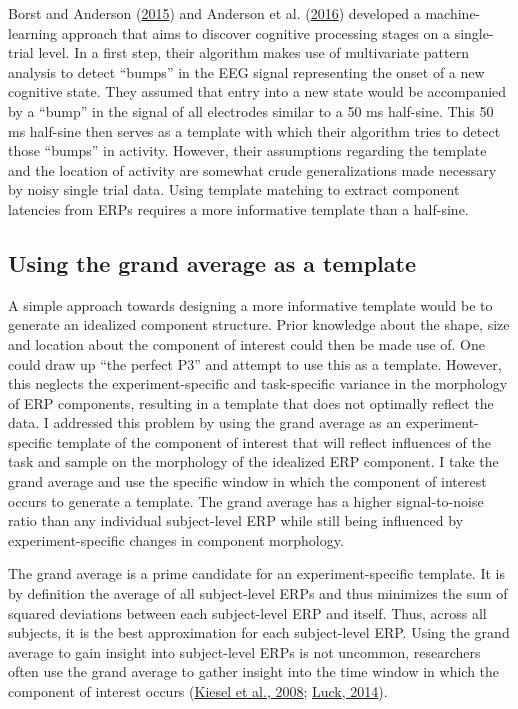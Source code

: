 \documentclass[
  man]{apa7}
\begin{document}
Borst and Anderson (\protect\hyperlink{ref-borst2015discovery}{2015}) and Anderson et al. (\protect\hyperlink{ref-anderson2016discovery}{2016}) developed a machine-learning approach that aims to discover cognitive processing stages on a single-trial level. In a first step, their algorithm makes use of multivariate pattern analysis to detect ``bumps'' in the EEG signal representing the onset of a new cognitive state. They assumed that entry into a new state would be accompanied by a ``bump'' in the signal of all electrodes similar to a 50 ms half-sine. This 50 ms half-sine then serves as a template with which their algorithm tries to detect those ``bumps'' in activity. However, their assumptions regarding the template and the location of activity are somewhat crude generalizations made necessary by noisy single trial data. Using template matching to extract component latencies from ERPs requires a more informative template than a half-sine.

\hypertarget{using-the-grand-average-as-a-template}{%
\subsection{Using the grand average as a template}\label{using-the-grand-average-as-a-template}}

A simple approach towards designing a more informative template would be to generate an idealized component structure. Prior knowledge about the shape, size and location about the component of interest could then be made use of. One could draw up ``the perfect P3'' and attempt to use this as a template. However, this neglects the experiment-specific and task-specific variance in the morphology of ERP components, resulting in a template that does not optimally reflect the data. I addressed this problem by using the grand average as an experiment-specific template of the component of interest that will reflect influences of the task and sample on the morphology of the idealized ERP component. I take the grand average and use the specific window in which the component of interest occurs to generate a template. The grand average has a higher signal-to-noise ratio than any individual subject-level ERP while still being influenced by experiment-specific changes in component morphology.

The grand average is a prime candidate for an experiment-specific template. It is by definition the average of all subject-level ERPs and thus minimizes the sum of squared deviations between each subject-level ERP and itself. Thus, across all subjects, it is the best approximation for each subject-level ERP. Using the grand average to gain insight into subject-level ERPs is not uncommon, researchers often use the grand average to gather insight into the time window in which the component of interest occurs (\protect\hyperlink{ref-kiesel2008measurement}{Kiesel et al., 2008}; \protect\hyperlink{ref-luck2014introduction}{Luck, 2014}).
\end{document}
